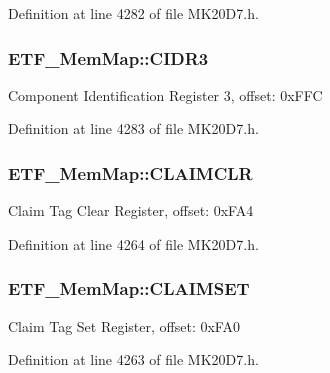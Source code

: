 Definition at line 4282 of file M\+K20\+D7.\+h.

\subsubsection[{\texorpdfstring{C\+I\+D\+R3}{CIDR3}}]{ E\+T\+F\+\_\+\+Mem\+Map\+::\+C\+I\+D\+R3}\hypertarget{struct_e_t_f___mem_map_a8ff6c84678887a89964218abe295b05f}{}\label{struct_e_t_f___mem_map_a8ff6c84678887a89964218abe295b05f}
Component Identification Register 3, offset\+: 0x\+F\+FC 

Definition at line 4283 of file M\+K20\+D7.\+h.

\subsubsection[{\texorpdfstring{C\+L\+A\+I\+M\+C\+LR}{CLAIMCLR}}]{ E\+T\+F\+\_\+\+Mem\+Map\+::\+C\+L\+A\+I\+M\+C\+LR}\hypertarget{struct_e_t_f___mem_map_a91788605a9f984b8e1a998b4f9b0b606}{}\label{struct_e_t_f___mem_map_a91788605a9f984b8e1a998b4f9b0b606}
Claim Tag Clear Register, offset\+: 0x\+F\+A4 

Definition at line 4264 of file M\+K20\+D7.\+h.

\subsubsection[{\texorpdfstring{C\+L\+A\+I\+M\+S\+ET}{CLAIMSET}}]{ E\+T\+F\+\_\+\+Mem\+Map\+::\+C\+L\+A\+I\+M\+S\+ET}\hypertarget{struct_e_t_f___mem_map_a044d760d7129c74de25a8f82ea1b4624}{}\label{struct_e_t_f___mem_map_a044d760d7129c74de25a8f82ea1b4624}
Claim Tag Set Register, offset\+: 0x\+F\+A0 

Definition at line 4263 of file M\+K20\+D7.\+h.

